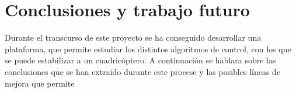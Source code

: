 \chapter{Conclusiones y trabajo futuro}

Durante el transcurso de este proyecto se ha conseguido desarrollar una plataforma, que permite estudiar los distintos algoritmos de control, con los que se puede estabilizar a un cuadricóptero. A continuación se hablara sobre las conclusiones que se han extraido durante este procese y las posibles líneas de mejora que permite 






